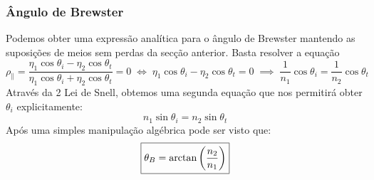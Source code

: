 \renewcommand*{\thefootnote}{\fnsymbol{footnote}}
\subsubsection[Ângulo de Brewster]{Ângulo de Brewster\protect\footnotemark[2]}

Podemos obter uma expressão analítica para o ângulo de Brewster mantendo as suposições de meios sem perdas da secção anterior. Basta resolver a equação
\begin{equation}
    \rho_{\parallel} = \frac{\eta_1 \cos \theta_i - \eta_2 \cos \theta_t}{\eta_1 \cos \theta_i + \eta_2 \cos \theta_t} = 0
    \; \iff \;
    \eta_1 \cos \theta_i - \eta_2 \cos \theta_t = 0
    \; \implies \;
    \frac{1}{n_1} \cos \theta_i = \frac{1}{n_2} \cos \theta_t
\end{equation}
Através da 2\textordfeminine{} Lei de Snell, obtemos uma segunda equação que nos permitirá obter $\theta_i$ explicitamente:
\begin{equation}
    n_1 \sin \theta_i = n_2 \sin \theta_t
\end{equation}
Após uma simples manipulação algébrica pode ser visto que:
\begin{equation}
    \boxed{%
        \theta_B = \arctan\left( \frac{n_2}{n_1} \right)
    }
\end{equation}

\renewcommand*{\thefootnote}{\fnsymbol{footnote}}

